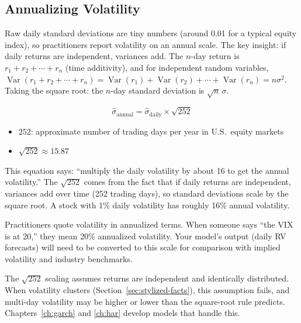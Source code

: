 \subsection{Annualizing Volatility}
\label{sec:annualizing}

Raw daily standard deviations are tiny numbers (around 0.01 for a typical equity index), so practitioners report volatility on an annual scale.
The key insight: if daily returns are independent, variances add.
The $n$-day return is $r_1 + r_2 + \cdots + r_n$ (time additivity), and for independent random variables, $\operatorname{Var}(r_1 + r_2 + \cdots + r_n) = \operatorname{Var}(r_1) + \operatorname{Var}(r_2) + \cdots + \operatorname{Var}(r_n) = n\sigma^2$.
Taking the square root: the $n$-day standard deviation is $\sqrt{n}\,\sigma$.

\begin{equation}
  \hat{\sigma}_{\text{annual}} = \hat{\sigma}_{\text{daily}} \times \sqrt{252}
  \label{eq:annualize}
\end{equation}
\begin{itemize}[nosep]
  \item $252$: approximate number of trading days per year in U.S.\ equity markets
  \item $\sqrt{252} \approx 15.87$
\end{itemize}

\begin{intuition}
This equation says: ``multiply the daily volatility by about 16 to get the annual volatility.''
The $\sqrt{252}$ comes from the fact that if daily returns are independent, variances add over time (252 trading days), so standard deviations scale by the square root.
A stock with 1\% daily volatility has roughly 16\% annual volatility.
\end{intuition}

\begin{projectconnection}
Practitioners quote volatility in annualized terms.
When someone says ``the VIX is at 20,'' they mean 20\% annualized volatility.
Your model's output (daily RV forecasts) will need to be converted to this scale for comparison with implied volatility and industry benchmarks.
\end{projectconnection}

\begin{warning}
The $\sqrt{252}$ scaling assumes returns are independent and identically distributed.
When volatility clusters (Section~\ref{sec:stylized-facts}), this assumption fails, and multi-day volatility may be higher or lower than the square-root rule predicts.
Chapters~\ref{ch:garch} and \ref{ch:har} develop models that handle this.
\end{warning}

